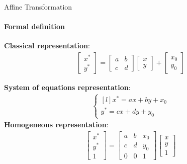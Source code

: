 \documentclass[aspectratio=169]{beamer}
\begin{document}
\begin{frame}[t]{Affine Transformation}
\framesubtitle{Formal definition}
\textbf{Classical representation}:\smallskip
    \begin{align*}
        \begin{bmatrix}x^*\\y^*\end{bmatrix} = \begin{bmatrix}
        a & b\\ 
        c & d 
        \end{bmatrix}\begin{bmatrix}x\\y\end{bmatrix} + \begin{bmatrix}x_0\\y_0\end{bmatrix}
    \end{align*} 

    \textbf{System of equations representation}:\smallskip
    \begin{align*}
        \left\{\begin{matrix*}[l]
        x^*=ax+by+x_0\\
        y^*=cx+dy+y_0 
        \end{matrix*}\right.
    \end{align*}
    \textbf{Homogeneous representation}:\smallskip
    \begin{align*}
        \begin{bmatrix}x^*\\y^*\\1\end{bmatrix}=\begin{bmatrix}
        a & b & x_0 \\
        c & d & y_0 \\ 
        0 & 0  & 1 
        \end{bmatrix}\begin{bmatrix}x\\y\\1\end{bmatrix}
    \end{align*}
\end{frame}
\end{document}
